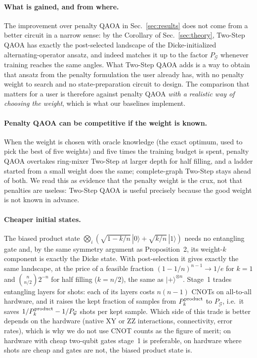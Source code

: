 \paragraph{What is gained, and from where.}
The improvement over penalty QAOA in Sec.~\ref{sec:results} does not come from a better circuit in a narrow sense:
by the Corollary of Sec.~\ref{sec:theory}, Two-Step QAOA has exactly the post-selected landscape of the Dicke-initialized
alternating-operator ansatz, and indeed matches it up to the factor $P_{\mathcal G}$ whenever training reaches the same angles. What Two-Step QAOA adds is a way to obtain that
ansatz from the penalty formulation the user already has, with no penalty weight to search and no state-preparation
circuit to design. The comparison that matters for a user is therefore against penalty QAOA \emph{with a realistic way of
choosing the weight}, which is what our baselines implement.

\paragraph{Penalty QAOA can be competitive if the weight is known.}
When the weight is chosen with oracle knowledge (the exact optimum, used to pick the best of five weights) and five times
the training budget is spent, penalty QAOA overtakes ring-mixer Two-Step at larger depth for half filling, and a ladder started
from a small weight does the same; complete-graph Two-Step stays ahead of both.
We read this as evidence that the penalty weight is the crux, not that penalties are useless: Two-Step QAOA is useful
precisely because the good weight is not known in advance.

\paragraph{Cheaper initial states.}
The biased product state $\bigotimes_i(\sqrt{1-k/n}\,|0\rangle+\sqrt{k/n}\,|1\rangle)$ needs no entangling gate and, by the
same symmetry argument as Proposition~2, its weight-$k$ component is exactly the Dicke state. With post-selection it gives
exactly the same landscape, at the price of a feasible fraction $(1-1/n)^{n-1}\to1/e$ for $k=1$ and $\binom{n}{n/2}2^{-n}$
for half filling ($k=n/2$), the same as $|+\rangle^{\otimes n}$. Stage~1 trades entangling layers for shots: each of its layers costs $n(n-1)$ CNOTs on all-to-all
hardware, and it raises the kept fraction of samples from $P_k^{\rm product}$ to $P_{\mathcal G}$, i.e.\ it saves $1/P_k^{\rm product}-1/P_{\mathcal G}$ shots per kept sample. Which side of this trade is better depends
on the hardware (native XY or ZZ interactions, connectivity, error rates), which is why we do not use CNOT counts as the
figure of merit; on hardware with cheap two-qubit gates stage~1 is preferable, on hardware where shots are cheap and gates
are not, the biased product state is.

